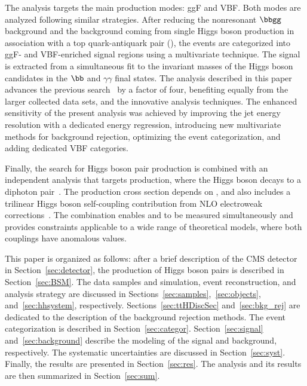 \documentclass[11pt,a4paper,cmspaper,final,collab]{cms-tdr}
\begin{document}
The analysis targets the main \HH production modes: ggF and VBF. Both modes are analyzed following similar strategies.
After reducing the nonresonant $\bbgg$ background and the background coming from single Higgs boson production in association with a top quark-antiquark pair (\ttH), the events are categorized into ggF- and VBF-enriched signal regions using a multivariate technique. The signal is extracted from a simultaneous fit to the invariant masses of the 
Higgs boson candidates in the $\bb$ and $\gamma\gamma$ final states.
The analysis described in this paper advances the previous \ppHHbbgg search~\cite{Sirunyan:2018iwt} by a factor of four, benefiting equally from the larger collected data sets, and the innovative analysis techniques. The enhanced sensitivity of the present analysis was achieved by improving the {\cPqb} jet energy resolution with a dedicated energy regression, introducing new multivariate methods for background rejection, optimizing the event categorization, and adding dedicated VBF categories. 


Finally, the search for Higgs boson pair production is combined with an independent analysis that targets \ttH production, where the Higgs boson decays to a diphoton pair~\cite{Sirunyan:2020sum}. The \ttH production cross section depends on \yt, and also includes a trilinear Higgs boson self-coupling contribution from NLO electroweak corrections~\cite{Maltoni:2017ims,Degrassi:2016wml}. The combination enables \lbdHHH and \yt to be measured simultaneously and provides constraints applicable to a wide range of theoretical models, where both couplings have anomalous values.

This paper is organized as follows: after a brief description of the CMS detector in Section~\ref{sec:detector}, the production of Higgs boson pairs is described in Section~\ref{sec:BSM}. The data samples and simulation, event reconstruction, and analysis strategy are discussed in Sections~\ref{sec:samples},~\ref{sec:objects}, and~\ref{sec:hhsystem}, respectively. Sections~\ref{sec:ttHDiscSec} and~\ref{sec:bkg_rej} are dedicated to the description of the background rejection methods. The event categorization is described in Section~\ref{sec:categor}. Section~\ref{sec:signal} and~\ref{sec:background} describe the modeling of the signal and background, respectively. The systematic uncertainties are discussed in Section~\ref{sec:syst}. Finally, the results are presented in Section~\ref{sec:res}. The analysis and its results are then summarized in Section~\ref{sec:sum}.
 
\end{document}
